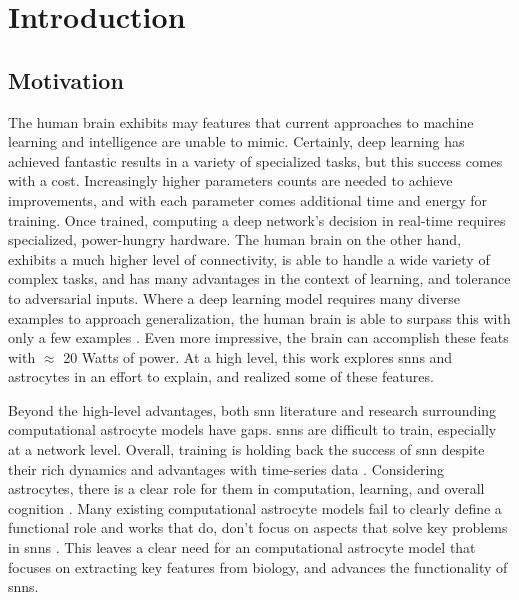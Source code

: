 %
%
%
%
%


\chapter{Introduction}\label{section:introduction}
\section{Motivation}

The human brain exhibits may features that current approaches to machine
learning and intelligence are unable to mimic. Certainly, deep learning has
achieved fantastic results in a variety of specialized tasks, but this success
comes with a cost. Increasingly higher parameters counts are needed to
achieve improvements, and with each parameter comes additional time and energy
for training. Once trained, computing a deep network's decision in real-time
requires specialized, power-hungry hardware. The human brain on the other hand,
exhibits a much higher level of connectivity, is able to handle a wide variety
of complex tasks, and has many advantages in the context of learning, and
tolerance to adversarial inputs. Where a deep learning model requires many
diverse examples to approach generalization, the human brain is able to
surpass this with only a few examples \parencite{tsimenidis_2020}. Even more
impressive, the brain can accomplish these feats with $\approx$ 20 Watts of
power. At a high level, this work explores \glspl{snn} and astrocytes in an
effort to explain, and realized some of these features.

Beyond the high-level advantages, both \gls{snn} literature and research
surrounding computational astrocyte models have gaps. \glspl{snn} are difficult
to train, especially at a network level. Overall, training is holding back
the success of \gls{snn} despite their rich dynamics and advantages with
time-series data \parencite{tavanaei_2019}. Considering astrocytes, there is a clear
role for them in computation, learning, and overall cognition
\parencite{mederos_2018}. Many existing computational astrocyte models fail to clearly
define a functional role and works that do, don't focus on aspects that solve key
problems in \glspl{snn} \parencite{manninen_2019}. This leaves a clear need for an
computational astrocyte model that focuses on extracting key features from
biology, and advances the functionality of \glspl{snn}.

